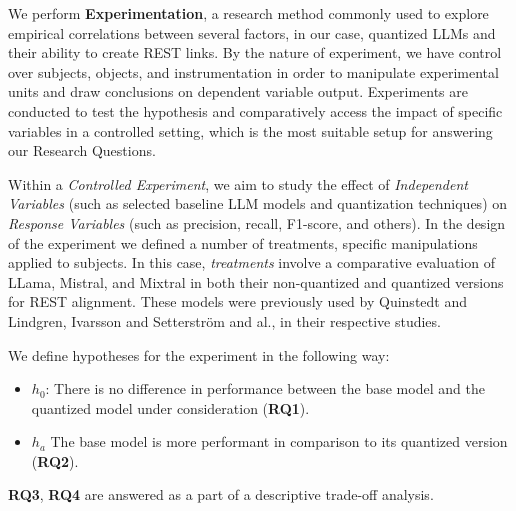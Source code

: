 \documentclass[conference]{IEEEtran}
\begin{document}
We perform \textbf{Experimentation}\cite{wohlin2012experimentation}, a research method commonly used
to explore empirical correlations between several factors, in our case,
quantized LLMs and their ability to create REST links. By the nature of
experiment, we have control over subjects, objects, and instrumentation in order
to manipulate experimental units and draw conclusions on dependent variable
output. Experiments are conducted to test the hypothesis and comparatively
access the impact of specific variables in a controlled setting, which is the
most suitable setup for answering our Research Questions.

Within a \textit{Controlled Experiment}, we aim to study the effect of
\textit{Independent Variables} (such as selected baseline LLM models and
quantization techniques) on \textit{Response Variables} (such as precision,
recall, F1-score, and others)\cite{wohlin2012experimentation}. In the design of
the experiment we defined a number of treatments, specific manipulations applied
to subjects\cite{wohlin2012experimentation}.  In this case, \textit{treatments}
involve a comparative evaluation of LLama, Mistral, and Mixtral in both their
non-quantized and quantized versions for REST alignment. These models were
previously used by Quinstedt and Lindgren, Ivarsson and Setterström and
al.\cite{quinstedt2024Optimizing},\cite{ivarsson2023automated} in their
respective studies. 

%

We define hypotheses for the experiment in the following way:
\begin{RQBox}
    \begin{itemize}
        \item $h_{0}$: There is no difference in performance between the base model
            and the quantized model under consideration (\textbf{RQ1}).
        \item $h_{a}$ The base model is more performant in comparison to its
            quantized version (\textbf{RQ2}).
    \end{itemize}
    
    \textbf{RQ3}, \textbf{RQ4} are answered as a part of a descriptive trade-off
    analysis.
\end{RQBox}
\end{document}

